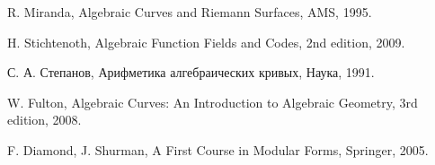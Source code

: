 \documentclass[a4paper, 12pt]{article}
\begin{document}
\begin{thebibliography}{9}

R. Miranda, Algebraic Curves and Riemann Surfaces, AMS, 1995.

H. Stichtenoth, Algebraic Function Fields and Codes, 2nd edition, 2009.

С. А. Степанов, Арифметика алгебраических кривых, Наука, 1991.

W. Fulton, Algebraic Curves: An Introduction to Algebraic Geometry, 3rd edition, 2008.

F. Diamond, J. Shurman, A First Course in Modular Forms, Springer, 2005.




\end{thebibliography}
\end{document}
